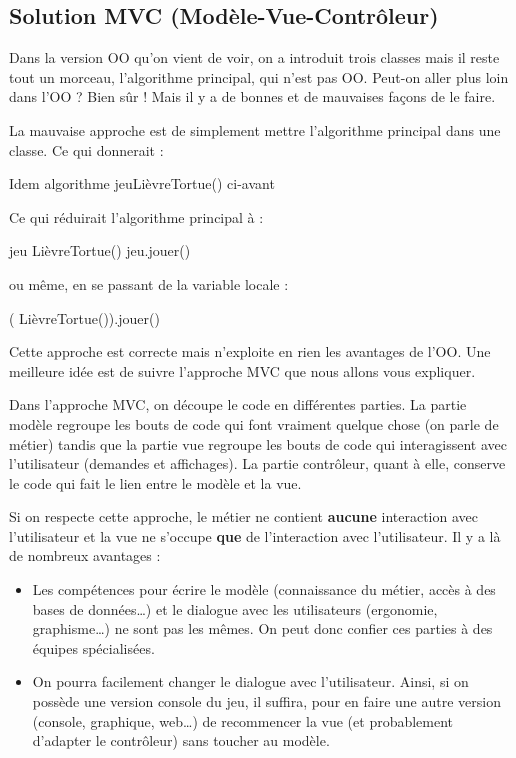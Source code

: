 	\subsection{Solution MVC (\og{}Modèle-Vue-Contrôleur\fg{})}
		
		Dans la version OO qu'on vient de voir,
		on a introduit trois classes 
		mais il reste tout un morceau, l'algorithme principal, qui n'est pas OO.
		Peut-on aller plus loin dans l'OO ?
		Bien sûr ! 
		Mais il y a de bonnes et de mauvaises façons de le faire.
		
		La mauvaise approche 
		est de simplement mettre l'algorithme principal dans une classe.
		Ce qui donnerait :

		\begin{LDA}
				\EndConstr
				\Empty
					\LComment Idem algorithme jeuLièvreTortue() ci-avant  
				\EndMethod
			\EndClass
		\end{LDA}
		
		Ce qui réduirait l'algorithme principal à :
		\begin{LDA}
			\Algo{jeuLièvreTortue}{}{}
				\Decl{jeu}{LièvreTortue}
				\Let jeu \Gets {} LièvreTortue()
				\Stmt jeu.jouer()
			\EndAlgo
		\end{LDA}
		ou même, en se passant de la variable locale :
		\begin{LDA}
				\Stmt ( LièvreTortue()).jouer()
			\EndAlgo
		\end{LDA}

		Cette approche est correcte mais n'exploite en rien 
		les avantages de l'OO.
		Une meilleure idée est de suivre l'approche MVC
		que nous allons vous expliquer.
		
		Dans l'approche MVC,
		on découpe le code en différentes parties.
		La partie \og{}modèle\fg{} regroupe les bouts de code
		qui font vraiment quelque chose (on parle de \og{}métier\fg{})
		tandis que la partie \og{}vue\fg{} regroupe les bouts de code
		qui interagissent avec l'utilisateur (demandes et affichages).
		La partie \og{}contrôleur\fg{}, quant à elle,
		conserve le code qui fait le lien entre le modèle et la vue.
		
		Si on respecte cette approche, 
		le métier ne contient \textbf{aucune} interaction avec l'utilisateur
		et la vue ne s'occupe \textbf{que} de l'interaction avec l'utilisateur.
		Il y a là de nombreux avantages :
		\begin{itemize}
		\item
			Les compétences pour écrire le modèle
			(connaissance du métier, accès à des bases de données\dots)
			et le dialogue avec les utilisateurs 
			(ergonomie, graphisme\dots)
			ne sont pas les mêmes.
			On peut donc confier ces parties à des équipes spécialisées.
		\item
			On pourra facilement changer le dialogue avec l'utilisateur.
			Ainsi, si on possède une version console du jeu,
			il suffira, pour en faire une autre version 
			(console, graphique, web\dots)
			de recommencer la vue 
			(et probablement d'adapter le contrôleur)
			sans toucher au modèle.
		\end{itemize}
	

